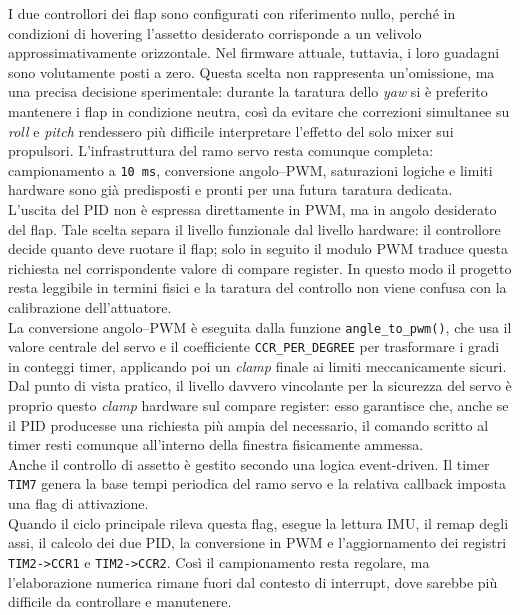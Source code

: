 \documentclass[11pt]{report}
\begin{document}
	I due controllori dei flap sono configurati con riferimento nullo, perché in condizioni di hovering l'assetto desiderato corrisponde a un velivolo approssimativamente orizzontale. Nel firmware attuale, tuttavia, i loro guadagni sono volutamente posti a zero. Questa scelta non rappresenta un'omissione, ma una precisa decisione sperimentale: durante la taratura dello \textit{yaw} si è preferito mantenere i flap in condizione neutra, così da evitare che correzioni simultanee su \textit{roll} e \textit{pitch} rendessero più difficile interpretare l'effetto del solo mixer sui propulsori. L'infrastruttura del ramo servo resta comunque completa: campionamento a \texttt{10 ms}, conversione angolo--PWM, saturazioni logiche e limiti hardware sono già predisposti e pronti per una futura taratura dedicata.\\
	L'uscita del PID non è espressa direttamente in PWM, ma in angolo desiderato del flap. Tale scelta separa il livello funzionale dal livello hardware: il controllore decide quanto deve ruotare il flap; solo in seguito il modulo PWM traduce questa richiesta nel corrispondente valore di compare register. In questo modo il progetto resta leggibile in termini fisici e la taratura del controllo non viene confusa con la calibrazione dell'attuatore.\\
	La conversione angolo--PWM è eseguita dalla funzione \texttt{angle\_to\_pwm()}, che usa il valore centrale del servo e il coefficiente \texttt{CCR\_PER\_DEGREE} per trasformare i gradi in conteggi timer, applicando poi un \textit{clamp} finale ai limiti meccanicamente sicuri. Dal punto di vista pratico, il livello davvero vincolante per la sicurezza del servo è proprio questo \textit{clamp} hardware sul compare register: esso garantisce che, anche se il PID producesse una richiesta più ampia del necessario, il comando scritto al timer resti comunque all'interno della finestra fisicamente ammessa.\\
	Anche il controllo di assetto è gestito secondo una logica event-driven. Il timer \texttt{TIM7} genera la base tempi periodica del ramo servo e la relativa callback imposta una flag di attivazione.\\
	Quando il ciclo principale rileva questa flag, esegue la lettura IMU, il remap degli assi, il calcolo dei due PID, la conversione in PWM e l'aggiornamento dei registri \texttt{TIM2->CCR1} e \texttt{TIM2->CCR2}. Così il campionamento resta regolare, ma l'elaborazione numerica rimane fuori dal contesto di interrupt, dove sarebbe più difficile da controllare e manutenere.
	
\end{document}
